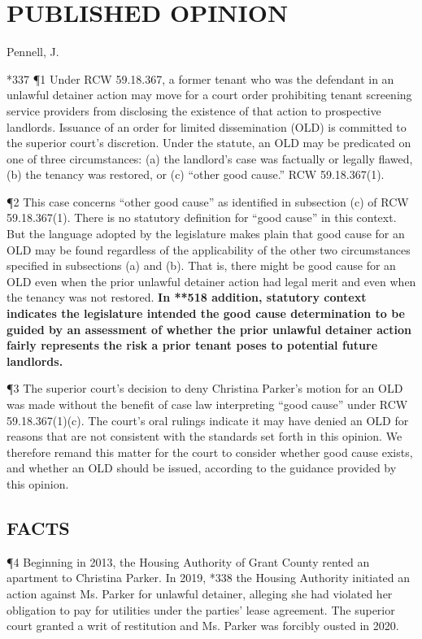 \documentclass[11pt]{article}
\begin{document}
\section{PUBLISHED OPINION}
\label{sec:org49f4233}
Pennell, J.

*337 ¶1 Under RCW 59.18.367, a former tenant who was the defendant in an unlawful detainer action may move for a court order prohibiting tenant screening service providers from disclosing the existence of that action to prospective landlords. Issuance of an order for limited dissemination (OLD) is committed to the superior court’s discretion. Under the statute, an OLD may be predicated on one of three circumstances: (a) the landlord’s case was factually or legally flawed, (b) the tenancy was restored, or (c) “other good cause.” RCW 59.18.367(1).

¶2 This case concerns “other good cause” as identified in subsection (c) of RCW 59.18.367(1). There is no statutory definition for “good cause” in this context. But the language adopted by the legislature makes plain that good cause for an OLD may be found regardless of the applicability of the other two circumstances specified in subsections (a) and (b). That is, there might be good cause for an OLD even when the prior unlawful detainer action had legal merit and even when the tenancy was not restored. \textbf{In **518 addition, statutory context indicates the legislature intended the good cause determination to be guided by an assessment of whether the prior unlawful detainer action fairly represents the risk a prior tenant poses to potential future landlords.}

¶3 The superior court’s decision to deny Christina Parker’s motion for an OLD was made without the benefit of case law interpreting “good cause” under RCW 59.18.367(1)(c). The court’s oral rulings indicate it may have denied an OLD for reasons that are not consistent with the standards set forth in this opinion. We therefore remand this matter for the court to consider whether good cause exists, and whether an OLD should be issued, according to the guidance provided by this opinion.

\subsection{FACTS}
\label{sec:orgce7ea41}
¶4 Beginning in 2013, the Housing Authority of Grant County rented an apartment to Christina Parker. In 2019, *338 the Housing Authority initiated an action against Ms. Parker for unlawful detainer, alleging she had violated her obligation to pay for utilities under the parties’ lease agreement. The superior court granted a writ of restitution and Ms. Parker was forcibly ousted in 2020.
\end{document}
